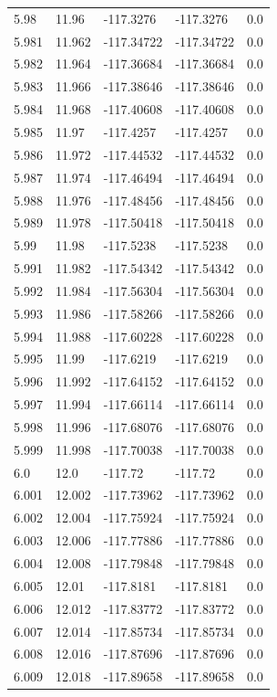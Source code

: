 \begin{tabular}{lllll}
5.98 & 11.96 & -117.3276 & -117.3276 & 0.0 \\
5.981 & 11.962 & -117.34722 & -117.34722 & 0.0 \\
5.982 & 11.964 & -117.36684 & -117.36684 & 0.0 \\
5.983 & 11.966 & -117.38646 & -117.38646 & 0.0 \\
5.984 & 11.968 & -117.40608 & -117.40608 & 0.0 \\
5.985 & 11.97 & -117.4257 & -117.4257 & 0.0 \\
5.986 & 11.972 & -117.44532 & -117.44532 & 0.0 \\
5.987 & 11.974 & -117.46494 & -117.46494 & 0.0 \\
5.988 & 11.976 & -117.48456 & -117.48456 & 0.0 \\
5.989 & 11.978 & -117.50418 & -117.50418 & 0.0 \\
5.99 & 11.98 & -117.5238 & -117.5238 & 0.0 \\
5.991 & 11.982 & -117.54342 & -117.54342 & 0.0 \\
5.992 & 11.984 & -117.56304 & -117.56304 & 0.0 \\
5.993 & 11.986 & -117.58266 & -117.58266 & 0.0 \\
5.994 & 11.988 & -117.60228 & -117.60228 & 0.0 \\
5.995 & 11.99 & -117.6219 & -117.6219 & 0.0 \\
5.996 & 11.992 & -117.64152 & -117.64152 & 0.0 \\
5.997 & 11.994 & -117.66114 & -117.66114 & 0.0 \\
5.998 & 11.996 & -117.68076 & -117.68076 & 0.0 \\
5.999 & 11.998 & -117.70038 & -117.70038 & 0.0 \\
6.0 & 12.0 & -117.72 & -117.72 & 0.0 \\
6.001 & 12.002 & -117.73962 & -117.73962 & 0.0 \\
6.002 & 12.004 & -117.75924 & -117.75924 & 0.0 \\
6.003 & 12.006 & -117.77886 & -117.77886 & 0.0 \\
6.004 & 12.008 & -117.79848 & -117.79848 & 0.0 \\
6.005 & 12.01 & -117.8181 & -117.8181 & 0.0 \\
6.006 & 12.012 & -117.83772 & -117.83772 & 0.0 \\
6.007 & 12.014 & -117.85734 & -117.85734 & 0.0 \\
6.008 & 12.016 & -117.87696 & -117.87696 & 0.0 \\
6.009 & 12.018 & -117.89658 & -117.89658 & 0.0 \\

\end{tabular}
